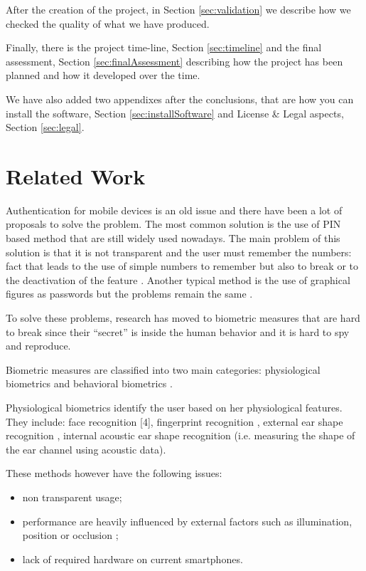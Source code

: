 After the creation of the project, in Section \ref{sec:validation} we describe how we checked the quality of what we have produced.

Finally, there is the project time-line, Section \ref{sec:timeline} and the final assessment, Section \ref{sec:finalAssessment} describing how the project has been planned and how it developed over the time.

We have also added two appendixes after the conclusions, that are how you can install the software, Section \ref{sec:installSoftware} and License \& Legal aspects, Section \ref{sec:legal}.

\newpage

\section{Related Work}
\label{sec:related}

Authentication for mobile devices is an old issue and there have been a lot of proposals to solve the problem. The most common solution is the use of PIN based method that are still widely used nowadays. The main problem of this solution is that it is not transparent and the user must remember the numbers: fact that leads to the use of simple numbers to remember but also to break or to the deactivation of the feature \cite{1284685}. Another typical method is the use of graphical figures as passwords but the problems remain the same \cite{USENIX_Security_99}.

To solve these problems, research has moved to biometric measures that are hard to break since their ``secret'' is inside the human behavior and it is hard to spy and reproduce. 

Biometric measures are classified into two main categories: physiological biometrics and behavioral biometrics \cite{621409}.

Physiological biometrics identify the user based on her physiological features. They include: face recognition [4], fingerprint recognition \cite{621409}, external ear shape recognition \cite{1296543}, internal acoustic ear shape recognition \cite{1104752} (i.e. measuring the shape of the ear channel using acoustic data). 

These methods however have the following issues:
\begin{itemize}
\item non transparent usage;
\item performance are heavily influenced by external factors such as illumination, position or occlusion \cite{621409}; 
\item lack of required hardware on current smartphones.
\end{itemize}


